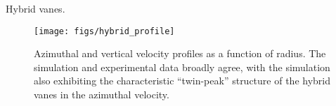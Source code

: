\label{app-validation}

Hybrid vanes.

\begin{figure}[!htb]
  \begin{center}
   \texttt{[image: figs/hybrid\_profile]}
   \caption{Azimuthal and vertical velocity profiles as a function of
   radius. The simulation and experimental data broadly agree, with
   the simulation also exhibiting the characteristic ``twin-peak''
   structure of the hybrid vanes in the azimuthal velocity. }
   \label{fig:lab}
  \end{center}
\end{figure}


